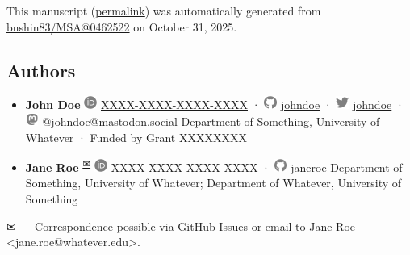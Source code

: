 This manuscript
(\href{https://bnshin83.github.io/MSA/v/046252210d18a2e53aa0100174f35285f30de4f5/}{permalink})
was automatically generated
from \href{https://github.com/bnshin83/MSA/tree/046252210d18a2e53aa0100174f35285f30de4f5}{bnshin83/MSA@0462522}
on October 31, 2025.

\hypertarget{authors}{%
\subsection{Authors}\label{authors}}

\begin{itemize}
\item
  \textbf{John Doe}
  \includegraphics[width=0.16667in,height=0.16667in]{images/orcid.svg}
  \href{https://orcid.org/XXXX-XXXX-XXXX-XXXX}{XXXX-XXXX-XXXX-XXXX}
  · \includegraphics[width=0.16667in,height=0.16667in]{images/github.svg}
  \href{https://github.com/johndoe}{johndoe}
  · \includegraphics[width=0.16667in,height=0.16667in]{images/twitter.svg}
  \href{https://twitter.com/johndoe}{johndoe}
  · \includegraphics[width=0.16667in,height=0.16667in]{images/mastodon.svg}
  \href{https://mastodon.social/@johndoe}{@johndoe@mastodon.social}
  Department of Something, University of Whatever
  · Funded by Grant XXXXXXXX
\item
  \textbf{Jane Roe}
  \textsuperscript{\protect\hyperlink{correspondence}{✉}}
  \includegraphics[width=0.16667in,height=0.16667in]{images/orcid.svg}
  \href{https://orcid.org/XXXX-XXXX-XXXX-XXXX}{XXXX-XXXX-XXXX-XXXX}
  · \includegraphics[width=0.16667in,height=0.16667in]{images/github.svg}
  \href{https://github.com/janeroe}{janeroe}
  Department of Something, University of Whatever; Department of Whatever, University of Something
\end{itemize}

\leavevmode{}%
✉ --- Correspondence possible via \href{https://github.com/bnshin83/MSA/issues}{GitHub Issues}
or email to
Jane Roe \textless jane.roe@whatever.edu\textgreater.


